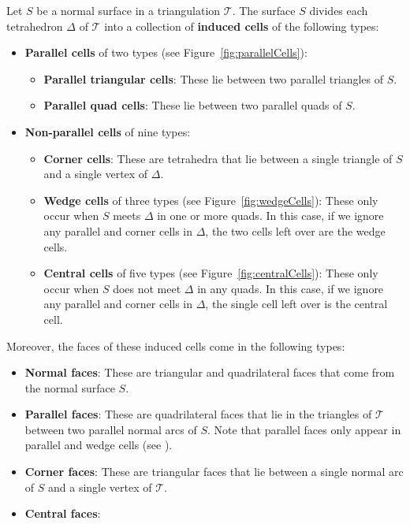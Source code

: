 \documentclass[a4paper,UKenglish,cleveref, autoref, thm-restate]{lipics-v2021}
\newcommand{\tri}{\mathcal{T}}
\begin{document}
\begin{definition}\label{defs:inducedCells}
Let $S$ be a normal surface in a triangulation $\tri$.
The surface $S$ divides each tetrahedron $\Delta$ of $\tri$ into a collection of \textbf{induced cells} of the following types:
\begin{itemize}
\item \textbf{Parallel cells} of two types (see Figure~\ref{fig:parallelCells}):
	\begin{itemize}
	\item \textbf{Parallel triangular cells}:
	These lie between two parallel triangles of $S$.
	\item \textbf{Parallel quad cells}:
	These lie between two parallel quads of $S$.
	\end{itemize}
\item \textbf{Non-parallel cells} of nine types:
	\begin{itemize}
	\item \textbf{Corner cells}: These are tetrahedra that lie between a single triangle of $S$ and a single vertex of $\Delta$.
	\item \textbf{Wedge cells} of three types (see Figure~\ref{fig:wedgeCells}):
	These only occur when $S$ meets $\Delta$ in one or more quads.
	In this case, if we ignore any parallel and corner cells in $\Delta$, the two cells left over are the wedge cells.
	\item \textbf{Central cells} of five types (see Figure~\ref{fig:centralCells}):
	These only occur when $S$ does not meet $\Delta$ in any quads.
	In this case, if we ignore any parallel and corner cells in $\Delta$, the single cell left over is the central cell.
	\end{itemize}
\end{itemize}
Moreover, the faces of these induced cells come in the following types:
\begin{itemize}
\item \textbf{Normal faces}:
These are triangular and quadrilateral faces that come from the normal surface $S$.
\item \textbf{Parallel faces}:
These are quadrilateral faces that lie in the triangles of $\tri$ between two parallel normal arcs of $S$.
Note that parallel faces only appear in parallel and wedge cells (see ).
\item \textbf{Corner faces}:
These are triangular faces that lie between a single normal arc of $S$ and a single vertex of $\tri$.
\item \textbf{Central faces}:

\end{itemize}
\end{definition}
\end{document}
